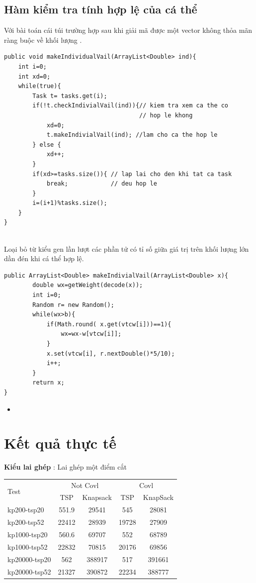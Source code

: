 \documentclass[a4paper,12pt]{report}
\begin{document}
\subsection{Hàm kiểm tra tính hợp lệ của cá thể}
Với bài toán cái túi trường hợp sau khi giải mã được một vector không thỏa mãn ràng buộc về khối lượng . 
\begin{lstlisting}
public void makeIndividualVail(ArrayList<Double> ind){
	int i=0;
	int xd=0;	
	while(true){
		Task t= tasks.get(i);
		if(!t.checkIndivialVail(ind)){// kiem tra xem ca the co		
									  // hop le khong
			xd=0;
			t.makeIndivialVail(ind); //lam cho ca the hop le
		} else {
			xd++;
		}
		if(xd>=tasks.size()){ // lap lai cho den khi tat ca task
			break;            // deu hop le
		}
		i=(i+1)%tasks.size();
	}
}
	
\end{lstlisting}
Loại bỏ từ kiểu gen lần lượt các phần tử có tỉ số giữa giá trị trên khối lượng lớn dần đén khi cá thể hợp lệ.
\begin{lstlisting}
public ArrayList<Double> makeIndivialVail(ArrayList<Double> x){
		double wx=getWeight(decode(x));
		int i=0;
		Random r= new Random();
		while(wx>b){
			if(Math.round( x.get(vtcw[i]))==1){
				wx=wx-w[vtcw[i]];
			}
			x.set(vtcw[i], r.nextDouble()*5/10);
			i++;
		}
		return x;
}
\end{lstlisting}
\begin{itemize}
\item 
\end{itemize}
\section{Kết quả thực tế}

\textbf{Kiểu lai ghép} : Lai ghép một điểm cắt


\begin{longtable}{|l |c |c |c |c|}
\hline
\multirow{2}{*}{Test} 
& \multicolumn{2}{c|}{Not Covl} &\multicolumn{2}{|c|}{Covl} \\
\cline{2-5}
&TSP & Knapsack & TSP & KnapSack \\
\hline
kp200-tsp20  & 551.9&29541 &545 &28081 
\\ \hline
kp200-tsp52&22412 &28939&19728 &27909 \\ \hline
kp1000-tsp20 &560.6&69707&552&68789 \\ \hline
kp1000-tsp52 &22832&70815&20176&69856 \\ \hline
kp20000-tsp20 &562&388917&517 &391661 \\ \hline
kp20000-tsp52 &21327&390872&22234& 388777\\ \hline
\end{longtable}
\end{document}
